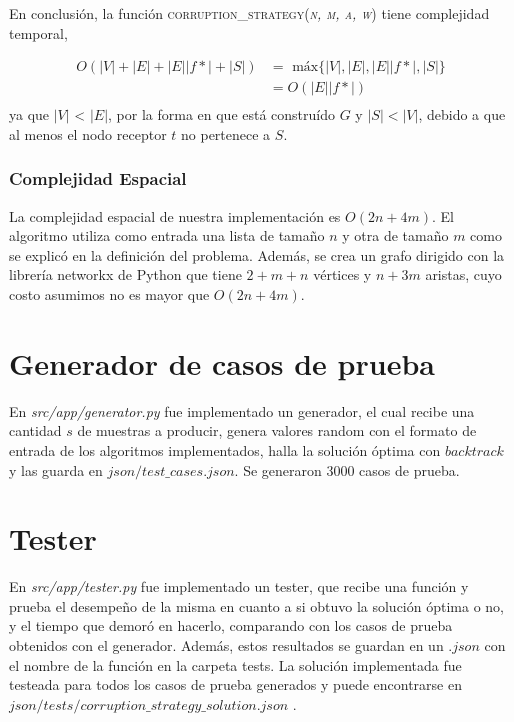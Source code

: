 \documentclass[10pt]{article} %
\begin{document}
	En conclusi\'on, la funci\'on \textsc{corruption\_strategy(\textit{n, m, a, w})} tiene complejidad temporal,
	
	\begin{equation}
		\begin{aligned}
			O(|V| + |E| + |E||f*| + |S|) &=\text{ m\'ax}\{|V|, |E|, |E||f*|, |S|\}\\
			&=O(|E||f*|)\\
		\end{aligned}		
	\end{equation}
	ya que $|V|$ < $|E|$, por la forma en que est\'a constru\'ido $G$ y $|S|<|V|$, debido a que al menos el nodo receptor $t$ no pertenece a $S$.

	

	\subsubsection{Complejidad Espacial}
	
	La complejidad espacial de nuestra implementaci\'on es $O(2n + 4m)$. El algoritmo utiliza como entrada una lista de tama\~no $n$ y otra de tama\~no $m$ como se explic\'o en la definici\'on del problema. Adem\'as, se crea un grafo dirigido con la librer\'ia networkx de Python que tiene $2 + m + n$ v\'ertices y $n + 3m$ aristas, cuyo costo asumimos no es mayor que $O(2n + 4m)$.
		
	\section{Generador de casos de prueba}
	
	En \textit{src/app/generator.py} fue implementado un generador, el cual recibe una cantidad $ s $ de muestras a producir, genera valores random con el formato de entrada de los algoritmos implementados, halla la soluci\'on \'optima con $ backtrack $ y las guarda en $ json/test\_cases.json $. Se generaron 3000 casos de prueba.
	
	\section{Tester}
	En \textit{src/app/tester.py} fue implementado un tester, que recibe una funci\'on y prueba el desempe\~no de la misma en cuanto a si obtuvo la soluci\'on \'optima o no, y el tiempo que demor\'o en hacerlo, comparando con los casos de prueba obtenidos con el generador. Adem\'as, estos resultados se guardan en un $ .json $ con el nombre de la funci\'on en la carpeta tests. La soluci\'on implementada fue testeada para todos los casos de prueba generados y puede encontrarse en $ json/tests/corruption\_strategy\_solution.json $ .
	
\end{document}
